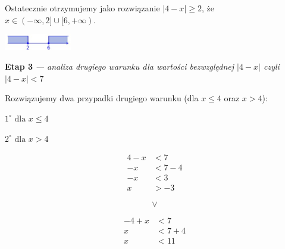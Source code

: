\documentclass[12pt, a4paper]{report}
\begin{document}
    \noindent
    Ostatecznie otrzymujemy jako rozwiązanie $|4 - x| \geq 2$, że $x \in (-\infty, 2] \cup [6, +\infty)$.

    \begin{center}
        \includegraphics[width=0.22\textwidth]{fig_4.jpg}
    \end{center}

    \vspace{15pt}                            %

    \noindent
    \textbf{Etap 3}
    \emph{ --- analiza drugiego warunku dla wartości bezwzględnej $|4-x|$ czyli $|4 - x| < 7$}

    \noindent
    Rozwiązujemy dwa przypadki drugiego warunku (dla $x \leq 4$ oraz $x > 4$):

    \noindent

    \vspace{10pt}                            %

    \begin{minipage}{0.33\textwidth}
        \raggedleft
        {$1^\circ \text{ dla } x \leq 4$}
    \end{minipage}
    \hspace{0.23\textwidth}
    \begin{minipage}{0.31\textwidth}
        \raggedright
        {$2^\circ \text{ dla } x > 4$}
    \end{minipage}
    \begin{center}
        \begin{minipage}{0.2\textwidth}
            \begin{align*}
                4 - x &< 7 \\
                -x &< 7 - 4 \\
                -x &< 3 \\
                x &> -3
            \end{align*}
        \end{minipage}
        \hspace{0.05\textwidth}
        \begin{minipage}{0.04\textwidth}
            \[
                \vee
            \]
        \end{minipage}
        \hspace{0.05\textwidth}
        \begin{minipage}{0.2\textwidth}
            \begin{align*}
                -4 + x &< 7 \\
                x &< 7 + 4 \\
                x &< 11
            \end{align*}
        \end{minipage}
    \end{center}
\end{document}
